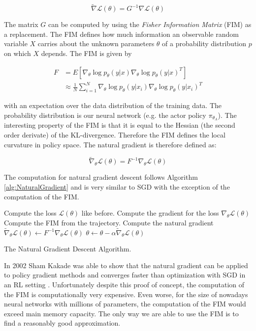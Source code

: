 \[\tilde{\nabla}\mathcal{L}(\theta) = G^{-1}\nabla\mathcal{L}(\theta) \]

The matrix $G$ can be computed by using the \textit{Fisher Information Matrix} (FIM) as a replacement. The FIM defines how much information an observable random variable $X$ carries about the unknown parameters $\theta$ of a probability distribution $p$ on which $X$ depends. The FIM is given by 

\begin{align*}
  F &= E \left[\nabla_\theta \log p_\theta(y|x) \nabla_\theta \log p_\theta(y|x)^T\right] \\
  &\approx \frac{1}{N} \sum^N_{i=1} \nabla_\theta \log p_\theta(y|x_i) \nabla_\theta \log p_\theta(y|x_i)^T
\end{align*}

with an expectation over the data distribution of the training data. The probability distribution is our neural network (e.g. the actor policy $\pi_{\theta_A}$). The interesting property of the FIM is that it is equal to the Hessian (the second order derivate) of the KL-divergence. Therefore the FIM defines the local curvature in policy space. The natural gradient is therefore defined as:

\[\tilde{\nabla}_\theta\mathcal{L}(\theta) = F^{-1}\nabla_\theta\mathcal{L}(\theta)\]

The computation for natural gradient descent follows Algorithm \ref{alg:NaturalGradient} and is very similar to SGD with the exception of the computation of the FIM. 

\begin{algorithm}[h!]
  
   {
    Compute the loss $\mathcal{L}(\theta)$ like before. \;
    Compute the gradient for the loss $\nabla_\theta \mathcal{L}(\theta)$ \;
    Compute the FIM from the trajectory. \;
    Compute the natural gradient $\tilde{\nabla}_\theta\mathcal{L}(\theta) \leftarrow F^{-1}\nabla_\theta\mathcal{L}(\theta)$ \;
    $\theta \leftarrow \theta - \alpha \tilde{\nabla}_\theta\mathcal{L}(\theta)$ \;
  }
  
  \caption[The Natural Gradient Descent Algorithm]{The Natural Gradient Descent Algorithm.}\label{alg:NaturalGradient}
 \end{algorithm}


In 2002 Sham Kakade was able to show that the natural gradient can be applied to policy gradient methods and converges faster than optimization with SGD in an RL setting \cite{kakade2002natural}. Unfortunately despite this proof of concept, the computation of the FIM is computationally very expensive. Even worse, for the size of nowadays neural networks with millions of parameters, the computation of the FIM would exceed main memory capacity. The only way we are able to use the FIM is to find a reasonably good approximation. 

